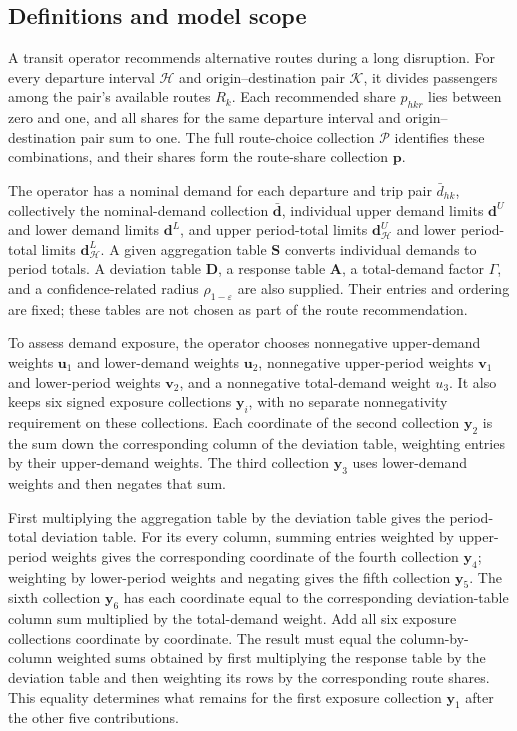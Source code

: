 \documentclass[10pt]{article}
\begin{document}
\subsection*{Definitions and model scope}
A transit operator recommends alternative routes during a long disruption. For every departure interval $\mathcal H$ and origin--destination pair $\mathcal K$, it divides passengers among the pair's available routes $R_k$. Each recommended share $p_{hkr}$ lies between zero and one, and all shares for the same departure interval and origin--destination pair sum to one. The full route-choice collection $\mathcal P$ identifies these combinations, and their shares form the route-share collection $\boldsymbol p$.

The operator has a nominal demand for each departure and trip pair $\bar d_{hk}$, collectively the nominal-demand collection $\bar{\boldsymbol d}$, individual upper demand limits $\boldsymbol d^U$ and lower demand limits $\boldsymbol d^L$, and upper period-total limits $\boldsymbol d^U_{\mathcal H}$ and lower period-total limits $\boldsymbol d^L_{\mathcal H}$. A given aggregation table $\boldsymbol S$ converts individual demands to period totals. A deviation table $\boldsymbol D$, a response table $\boldsymbol A$, a total-demand factor $\Gamma$, and a confidence-related radius $\rho_{1-\varepsilon}$ are also supplied. Their entries and ordering are fixed; these tables are not chosen as part of the route recommendation.

To assess demand exposure, the operator chooses nonnegative upper-demand weights $\boldsymbol u_1$ and lower-demand weights $\boldsymbol u_2$, nonnegative upper-period weights $\boldsymbol v_1$ and lower-period weights $\boldsymbol v_2$, and a nonnegative total-demand weight $u_3$. It also keeps six signed exposure collections $\boldsymbol y_i$, with no separate nonnegativity requirement on these collections. Each coordinate of the second collection $\boldsymbol y_2$ is the sum down the corresponding column of the deviation table, weighting entries by their upper-demand weights. The third collection $\boldsymbol y_3$ uses lower-demand weights and then negates that sum.

First multiplying the aggregation table by the deviation table gives the period-total deviation table. For its every column, summing entries weighted by upper-period weights gives the corresponding coordinate of the fourth collection $\boldsymbol y_4$; weighting by lower-period weights and negating gives the fifth collection $\boldsymbol y_5$. The sixth collection $\boldsymbol y_6$ has each coordinate equal to the corresponding deviation-table column sum multiplied by the total-demand weight. Add all six exposure collections coordinate by coordinate. The result must equal the column-by-column weighted sums obtained by first multiplying the response table by the deviation table and then weighting its rows by the corresponding route shares. This equality determines what remains for the first exposure collection $\boldsymbol y_1$ after the other five contributions.
\end{document}
